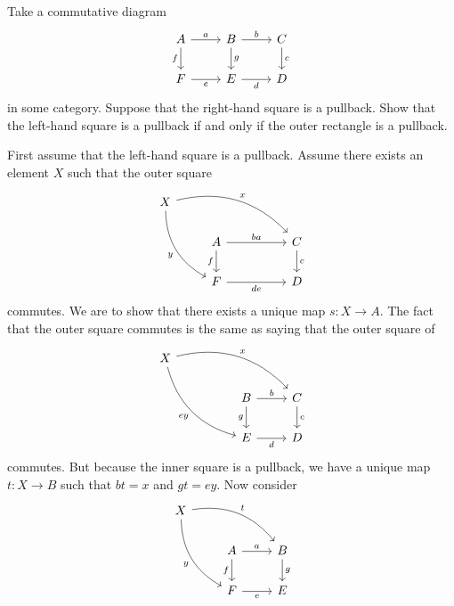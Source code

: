 \documentclass[11pt,a4paper]{article}
\begin{document}
\begin{exercise}\label{ex:pullbacklemma}
    Take a commutative diagram
    \begin{equation*}
    \begin{tikzcd}
        A \arrow[r, "a"] \arrow[d, "f"'] & B \arrow[r, "b"] \arrow[d, "g"] & C \arrow[d, "c"] \\
        F \arrow[r, "e"'] & E \arrow[r, "d"'] & D
    \end{tikzcd}
    \end{equation*}
    in some category. Suppose that the right-hand square is a pullback. Show that the left-hand square is a pullback if and only if the outer rectangle is a pullback.
\end{exercise}
\begin{solution}
    First assume that the left-hand square is a pullback. Assume there exists an element $X$ such that the outer square
    \begin{equation}\label{eq:outsq}
    \begin{tikzcd}
        X \arrow[drrr, bend left, "x"] \arrow[ddr, bend right, "y"'] \\
        & A \arrow[rr, "ba"] \arrow[d, "f"'] && C \arrow[d, "c"] \\
        & F \arrow[rr, "de"'] && D
    \end{tikzcd}
    \end{equation}
    commutes. We are to show that there exists a unique map $s:X\to A$. The fact that the outer square commutes is the same as saying that the outer square of
    \begin{equation*}
    \begin{tikzcd}
        X \arrow[drrr, bend left, "x"] \arrow[ddrr, bend right, "ey"'] \\
        && B \arrow[r, "b"] \arrow[d, "g"'] & C \arrow[d, "c"] \\
        && E \arrow[r, "d"'] & D
    \end{tikzcd}
    \end{equation*}
    commutes. But because the inner square is a pullback, we have a unique map $t:X\to B$ such that $bt=x$ and $gt=ey$. Now consider
    \begin{equation*}
    \begin{tikzcd}
        X \arrow[drr, bend left, "t"] \arrow[ddr, bend right, "y"'] \\
        & A \arrow[r, "a"] \arrow[d, "f"'] & B \arrow[d, "g"] \\
        & F \arrow[r, "e"'] & E
    \end{tikzcd}

\end{equation*}
\end{solution}
\end{document}
